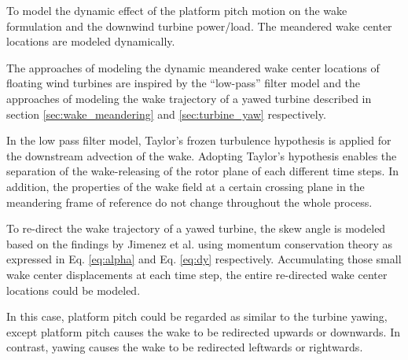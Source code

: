 \documentclass{umthesis}
\begin{document}
To model the dynamic effect of the platform pitch motion on the wake formulation and the downwind turbine power/load. The meandered wake center locations are modeled dynamically.

The approaches of modeling the dynamic meandered wake center locations of floating wind turbines are inspired by the ``low-pass'' filter model and the approaches of modeling the wake trajectory of a yawed turbine described in section \ref{sec:wake_meandering} and \ref{sec:turbine_yaw} respectively. 

In the low pass filter model, Taylor's frozen turbulence hypothesis is applied for the downstream advection of the wake. Adopting Taylor's hypothesis enables the separation of the wake-releasing of the rotor plane of each different time steps. In addition, the properties of the wake field at a certain crossing plane in the meandering frame of reference do not change throughout the whole process.

To re-direct the wake trajectory of a yawed turbine, the skew angle is modeled based on the findings by Jimenez et al. using momentum conservation theory \cite{Jiménez} as expressed in Eq. \ref{eq:alpha} and Eq. \ref{eq:dy} respectively. Accumulating those small wake center displacements at each time step, the entire re-directed wake center locations could be modeled. 

In this case, platform pitch could be regarded as similar to the turbine yawing, except platform pitch causes the wake to be redirected upwards or downwards. In contrast, yawing causes the wake to be redirected leftwards or rightwards.
\end{document}
